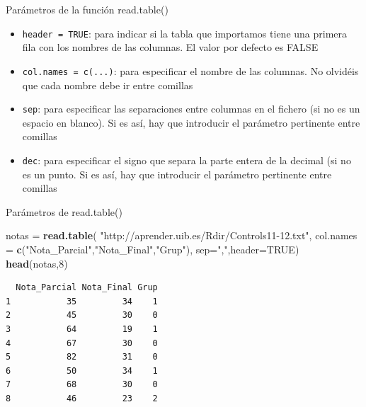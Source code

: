 \documentclass[
  ignorenonframetext,
]{beamer}
\newenvironment{Shaded}{\begin{snugshade}}{\end{snugshade}}
\newcommand{\AttributeTok}[1]{\textcolor[rgb]{0.13,0.29,0.53}{#1}}
\newcommand{\ConstantTok}[1]{\textcolor[rgb]{0.56,0.35,0.01}{#1}}
\newcommand{\DecValTok}[1]{\textcolor[rgb]{0.00,0.00,0.81}{#1}}
\newcommand{\FunctionTok}[1]{\textcolor[rgb]{0.13,0.29,0.53}{\textbf{#1}}}
\newcommand{\NormalTok}[1]{#1}
\newcommand{\OtherTok}[1]{\textcolor[rgb]{0.56,0.35,0.01}{#1}}
\newcommand{\StringTok}[1]{\textcolor[rgb]{0.31,0.60,0.02}{#1}}
\providecommand{\tightlist}{%
  \setlength{\itemsep}{0pt}\setlength{\parskip}{0pt}}
\begin{document}
\begin{frame}[fragile]{Parámetros de la función read.table()}
\label{paruxe1metros-de-la-funciuxf3n-read.table}
\begin{itemize}
\tightlist
\item
  \texttt{header\ =\ TRUE}: para indicar si la tabla que importamos
  tiene una primera fila con los nombres de las columnas. El valor por
  defecto es FALSE
\item
  \texttt{col.names\ =\ c(...)}: para especificar el nombre de las
  columnas. No olvidéis que cada nombre debe ir entre comillas
\item
  \texttt{sep}: para especificar las separaciones entre columnas en el
  fichero (si no es un espacio en blanco). Si es así, hay que introducir
  el parámetro pertinente entre comillas
\item
  \texttt{dec}: para especificar el signo que separa la parte entera de
  la decimal (si no es un punto. Si es así, hay que introducir el
  parámetro pertinente entre comillas
\end{itemize}
\end{frame}

\begin{frame}[fragile]{Parámetros de read.table()}
\label{paruxe1metros-de-read.table}
\begin{Shaded}
\begin{Highlighting}[]
\NormalTok{notas }\OtherTok{=} \FunctionTok{read.table}\NormalTok{(}
  \StringTok{"http://aprender.uib.es/Rdir/Controls11{-}12.txt"}\NormalTok{, }
  \AttributeTok{col.names =} \FunctionTok{c}\NormalTok{(}\StringTok{"Nota\_Parcial"}\NormalTok{,}\StringTok{"Nota\_Final"}\NormalTok{,}\StringTok{"Grup"}\NormalTok{),}
  \AttributeTok{sep=}\StringTok{","}\NormalTok{,}\AttributeTok{header=}\ConstantTok{TRUE}\NormalTok{)}
\FunctionTok{head}\NormalTok{(notas,}\DecValTok{8}\NormalTok{)}
\end{Highlighting}
\end{Shaded}

\begin{verbatim}
  Nota_Parcial Nota_Final Grup
1           35         34    1
2           45         30    0
3           64         19    1
4           67         30    0
5           82         31    0
6           50         34    1
7           68         30    0
8           46         23    2
\end{verbatim}
\end{frame}
\end{document}
